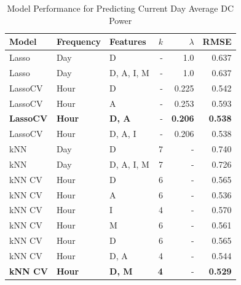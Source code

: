 \begin{table}[h]
    \centering
    \caption{Model Performance for Predicting Current Day Average DC Power}
    \begin{tabular}{|l|l|l|r|r|r|} 
    \hline
    \textbf{Model} & \textbf{Frequency} & \textbf{Features} & \textbf{$k$} & \textbf{$\lambda$} & \textbf{RMSE} \\ \hline
    Lasso & Day & D & - & 1.0 & 0.637 \\ \hline
    Lasso & Day & D, A, I, M & - & 1.0 & 0.637 \\ \hline
    LassoCV & Hour & D & - & 0.225 & 0.542 \\ \hline
    LassoCV & Hour & A & - & 0.253 & 0.593 \\ \hline
    \textbf{LassoCV} & \textbf{Hour} & \textbf{D, A} & - & \textbf{0.206} & \textbf{0.538} \\ \hline
    LassoCV & Hour & D, A, I & - & 0.206 & 0.538 \\ \hline
    kNN & Day & D & 7 & - & 0.740 \\ \hline
    kNN & Day & D, A, I, M & 7 & - & 0.726 \\ \hline
    kNN CV & Hour & D & 6 & - & 0.565 \\ \hline
    kNN CV & Hour & A & 6 & - & 0.536 \\ \hline
    kNN CV & Hour & I & 4 & - & 0.570 \\ \hline
    kNN CV & Hour & M & 6 & - & 0.561 \\ \hline
    kNN CV & Hour & D & 6 & - & 0.565 \\ \hline
    kNN CV & Hour & D, A & 4 & - & 0.544 \\ \hline
    \textbf{kNN CV} & \textbf{Hour} & \textbf{D, M} & \textbf{4} & - & \textbf{0.529} \\ \hline
    \end{tabular}
    \label{tab:model_comparison}
\end{table}